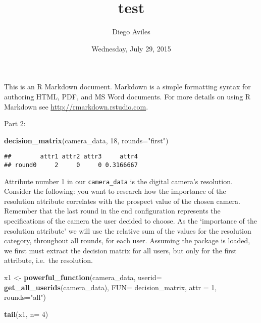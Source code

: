 \documentclass[]{article}
\title{test}
\author{Diego Aviles}
\date{Wednesday, July 29, 2015}
\newenvironment{Shaded}{\begin{snugshade}}{\end{snugshade}}
\newcommand{\KeywordTok}[1]{\textcolor[rgb]{0.13,0.29,0.53}{\textbf{{#1}}}}
\newcommand{\DataTypeTok}[1]{\textcolor[rgb]{0.13,0.29,0.53}{{#1}}}
\newcommand{\DecValTok}[1]{\textcolor[rgb]{0.00,0.00,0.81}{{#1}}}
\newcommand{\StringTok}[1]{\textcolor[rgb]{0.31,0.60,0.02}{{#1}}}
\newcommand{\NormalTok}[1]{{#1}}
\begin{document}
\maketitle


This is an R Markdown document. Markdown is a simple formatting syntax
for authoring HTML, PDF, and MS Word documents. For more details on
using R Markdown see \url{http://rmarkdown.rstudio.com}.

Part 2:

\begin{Shaded}
\begin{Highlighting}[]
\KeywordTok{decision_matrix}\NormalTok{(camera_data, }\DecValTok{18}\NormalTok{, }\DataTypeTok{rounds=}\StringTok{"first"}\NormalTok{)}
\end{Highlighting}
\end{Shaded}

\begin{verbatim}
##        attr1 attr2 attr3     attr4
## round0     2     0     0 0.3166667
\end{verbatim}

Attribute number 1 in our \texttt{camera\_data} is the digital camera's
resolution. Consider the following: you want to research how the
importance of the resolution attribute correlates with the prospect
value of the chosen camera. Remember that the last round in the end
configuration represents the specifications of the camera the user
decided to choose. As the `importance of the resolution attribute' we
will use the relative sum of the values for the resolution category,
throughout all rounds, for each user. Assuming the package is loaded, we
first must extract the decision matrix for all users, but only for the
first attribute, i.e.~the resolution.

\begin{Shaded}
\begin{Highlighting}[]
\NormalTok{x1 <-}\StringTok{ }\KeywordTok{powerful_function}\NormalTok{(camera_data, }\DataTypeTok{userid=} \KeywordTok{get_all_userids}\NormalTok{(camera_data),}
                        \DataTypeTok{FUN=} \NormalTok{decision_matrix, }
                        \DataTypeTok{attr =} \DecValTok{1}\NormalTok{, }
                        \DataTypeTok{rounds=}\StringTok{"all"}\NormalTok{)}
\end{Highlighting}
\end{Shaded}

\begin{Shaded}
\begin{Highlighting}[]
\KeywordTok{tail}\NormalTok{(x1, }\DataTypeTok{n=} \DecValTok{4}\NormalTok{)}
\end{Highlighting}
\end{Shaded}
\end{document}
